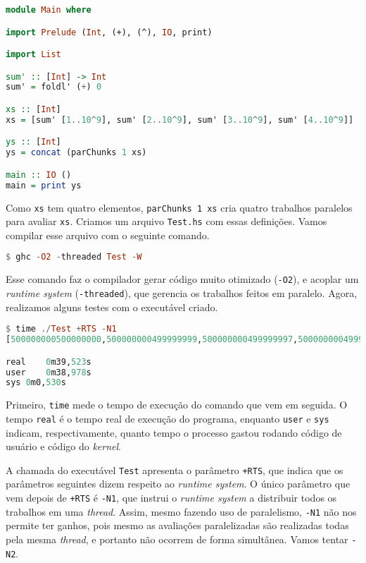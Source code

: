 \documentclass[a4paper]{article}
\begin{document}
\begin{lstlisting}[language=haskell, frame=single]
module Main where

import Prelude (Int, (+), (^), IO, print)

import List

sum' :: [Int] -> Int
sum' = foldl' (+) 0

xs :: [Int]
xs = [sum' [1..10^9], sum' [2..10^9], sum' [3..10^9], sum' [4..10^9]]

ys :: [Int]
ys = concat (parChunks 1 xs)

main :: IO ()
main = print ys
\end{lstlisting}

Como \texttt{xs} tem quatro elementos, \texttt{parChunks 1 xs} cria quatro trabalhos paralelos para avaliar \texttt{xs}.
Criamos um arquivo \texttt{Test.hs} com essas definições.
Vamos compilar esse arquivo com o seguinte comando.

\begin{lstlisting}[language=haskell, frame=single]
$ ghc -O2 -threaded Test -W
\end{lstlisting}

Esse comando faz o compilador gerar código muito otimizado (\texttt{-O2}), e acoplar um \emph{runtime system} (\texttt{-threaded}), que gerencia os trabalhos feitos em paralelo.
Agora, realizamos alguns testes com o executável criado.

\begin{lstlisting}[language=haskell, frame=single]
$ time ./Test +RTS -N1
[500000000500000000,500000000499999999,500000000499999997,500000000499999994]

real	0m39,523s
user	0m38,978s
sys	0m0,530s
\end{lstlisting}

Primeiro, \texttt{time} mede o tempo de execução do comando que vem em seguida.
O tempo \texttt{real} é o tempo real de execução do programa, enquanto \texttt{user} e \texttt{sys} indicam, respectivamente, quanto tempo o processo gastou rodando código de usuário e código do \emph{kernel}.

A chamada do executável \texttt{Test} apresenta o parâmetro \texttt{+RTS}, que indica que os parâmetros seguintes dizem respeito ao \emph{runtime system}.
O único parâmetro que vem depois de \texttt{+RTS} é \texttt{-N1}, que instrui o \emph{runtime system} a distribuir todos os trabalhos em uma \emph{thread}.
Assim, mesmo fazendo uso de paralelismo, \texttt{-N1} não nos permite ter ganhos, pois mesmo as avaliações paralelizadas são realizadas todas pela mesma \emph{thread}, e portanto não ocorrem de forma simultânea.
Vamos tentar \texttt{-N2}.
\end{document}
